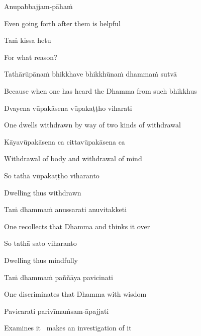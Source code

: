 Anupabbajjam-pāhaṁ

\begin{english}
  Even going forth after them is helpful
\end{english}

Taṁ kissa hetu

\begin{english}
  For what reason?
\end{english}

Tathārūpānaṁ bhikkhave bhikkhūnaṁ dhammaṁ sutvā

\begin{english}
  Because when one has heard the Dhamma from such bhikkhus
\end{english}

Dvayena vūpakāsena vūpakaṭṭho viharati

\begin{english}
  One dwells withdrawn by way of two kinds of withdrawal
\end{english}

Kāyavūpakāsena ca cittavūpakāsena ca

\begin{english}
  Withdrawal of body and withdrawal of mind
\end{english}

So tathā vūpakaṭṭho viharanto

\begin{english}
  Dwelling thus withdrawn
\end{english}

Taṁ dhammaṁ anussarati anuvitakketi

\begin{english}
  One recollects that Dhamma and thinks it over
\end{english}

So tathā sato viharanto

\begin{english}
  Dwelling thus mindfully
\end{english}

Taṁ dhammaṁ paññāya pavicinati

\begin{english}
  One discriminates that Dhamma with wisdom
\end{english}

Pavicarati parivīmaṁsam-āpajjati

\begin{english}
  Examines it \breathmark\ makes an investigation of it
\end{english}

